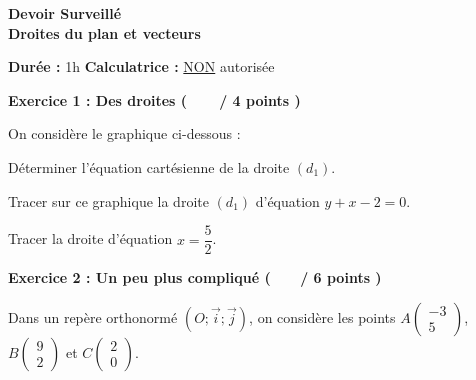 \documentclass[12pt,a4paper]{exam}
\newcommand*{\Coord}[2]{%
  \ensuremath{
    \begin{pmatrix}
      #1 \\[0pt]
      #2
    \end{pmatrix}}
}
\begin{document}
\begin{center}
    \Large\textbf{Devoir Surveillé\\Droites du plan et vecteurs}
\end{center}

\vspace{0.3cm}

\noindent
\textbf{Durée :} 1h \hfill
\textbf{Calculatrice :} \underline{NON} autorisée

\vspace{0.5cm}

\noindent
\textbf{Exercice 1 : Des droites (\ \ \ \  / 4 points )}

\vspace{10pt}
On considère le graphique ci-dessous :

\begin{center}
\end{center}


\begin{questions}

\question[2] Déterminer l'équation cartésienne de la droite $(d_1)$.

\question[1] Tracer sur ce graphique la droite $(d_1)$ d'équation $y +x -2 = 0$.

\question[1] Tracer la droite d'équation $x = \dfrac{5}{2}$.

\end{questions}

\vspace{1cm}

\noindent
\textbf{Exercice 2 : Un peu plus compliqué ( \ \ \ / 6 points )}

\vspace{10pt}
Dans un repère orthonormé $(O;\overrightarrow{i};\overrightarrow{j})$, on considère les points 
$A\Coord{-3}{5}$, $B\Coord{9}{2}$ et $C\Coord{2}{0}$.
\end{document}
